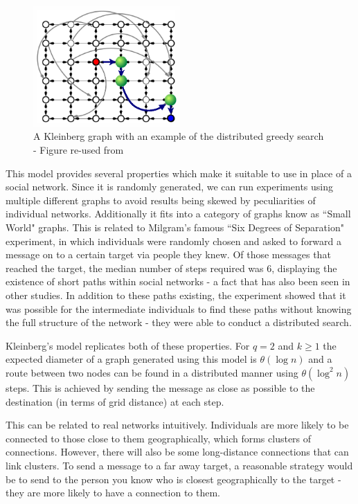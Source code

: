 \documentclass[bsc,frontabs,twoside,singlespacing,parskip,deptreport]{infthesis}     %
\begin{document}
\begin{figure}[]
  \centering
    \includegraphics[width=0.5\textwidth]{Schabanel11_Kleinbergs_Network}
  \caption{A Kleinberg graph with an example of the distributed greedy search - Figure re-used from \cite{Schabanel11}}
\end{figure}

This model provides several properties which make it suitable to use in place of a social network. Since it is randomly generated, we can run experiments using multiple different graphs to avoid results being skewed by peculiarities of individual networks. Additionally it fits into a category of graphs know as ``Small World" graphs. This is related to Milgram's famous ``Six Degrees of Separation" experiment\cite{Milgram67,TraversMilgram69}, in which individuals were randomly chosen and asked to forward a message on to a certain target via people they knew. Of those messages that reached the target, the median number of steps required was 6, displaying the existence of short paths within social networks - a fact that has also been seen in other studies\cite{MilgramBackup1,MilgramBackup2}. In addition to these paths existing, the experiment showed that it was possible for the intermediate individuals to find these paths without knowing the full structure of the network - they were able to conduct a distributed search. 

Kleinberg's model replicates both of these properties. For $q = 2$ and $k \ge 1$ the expected diameter of a graph generated using this model is $\theta (\log n)$ and a route between two nodes can be found in a distributed manner using $\theta (\log^{2}n)$ steps\cite{AnalyzingKleinberg}. This is achieved by sending the message as close as possible to the destination (in terms of grid distance) at each step.

This can be related to real networks intuitively. Individuals are more likely to be connected to those close to them geographically, which forms clusters of connections. However, there will also be some long-distance connections that can link clusters. To send a message to a far away target, a reasonable strategy would be to send to the person you know who is closest geographically to the target - they are more likely to have a connection to them.
\end{document}
